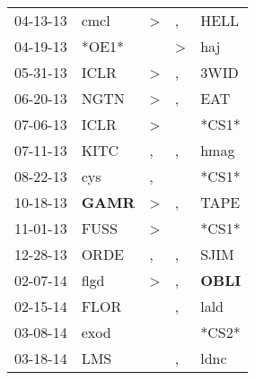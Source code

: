 \begin{supertabular}{p{0.07\textwidth}p{0.06\textwidth}p{0.02\textwidth}p{0.02\textwidth}p{0.06\textwidth}}
          04-13-13\textsuperscript{} &           cmcl\textsuperscript{} &     \textgreater &                , &           HELL\textsuperscript{} \\
          04-19-13\textsuperscript{} &                            *OE1* &                  &     \textgreater &            haj\textsuperscript{} \\
          05-31-13\textsuperscript{} &           ICLR\textsuperscript{} &     \textgreater &                , &           3WID\textsuperscript{} \\
          06-20-13\textsuperscript{} &           NGTN\textsuperscript{} &     \textgreater &                , &            EAT\textsuperscript{} \\
          07-06-13\textsuperscript{} &           ICLR\textsuperscript{} &     \textgreater &                  &                            *CS1* \\
          07-11-13\textsuperscript{} &           KITC\textsuperscript{} &                , &                , &           hmag\textsuperscript{} \\
          08-22-13\textsuperscript{} &            cys\textsuperscript{} &                , &                  &                            *CS1* \\
          10-18-13\textsuperscript{} &  \textbf{GAMR\textsuperscript{}} &     \textgreater &                , &           TAPE\textsuperscript{} \\
          11-01-13\textsuperscript{} &           FUSS\textsuperscript{} &     \textgreater &                  &                            *CS1* \\
          12-28-13\textsuperscript{} &           ORDE\textsuperscript{} &                , &                , &           SJIM\textsuperscript{} \\
          02-07-14\textsuperscript{} &           flgd\textsuperscript{} &     \textgreater &                , &  \textbf{OBLI\textsuperscript{}} \\
          02-15-14\textsuperscript{} &           FLOR\textsuperscript{} &                  &                , &           lald\textsuperscript{} \\
          03-08-14\textsuperscript{} &           exod\textsuperscript{} &                  &                  &                            *CS2* \\
          03-18-14\textsuperscript{} &            LMS\textsuperscript{} &                  &                , &           ldnc\textsuperscript{} \\

\end{supertabular}
